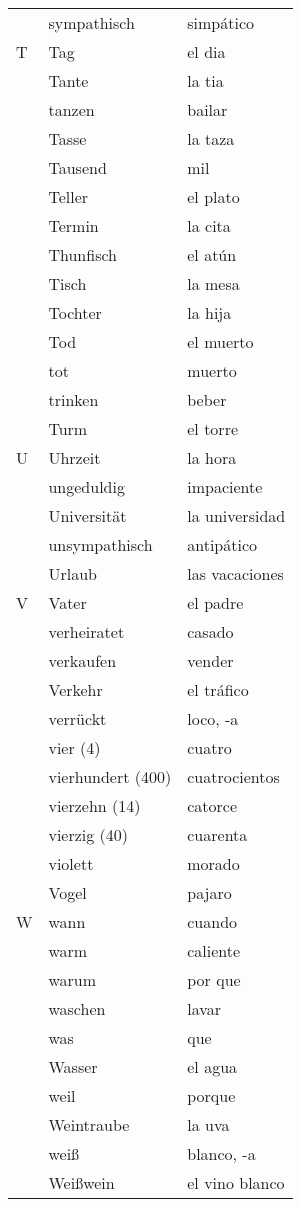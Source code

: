\documentclass[10pt,spanish]{article}
\begin{document}
\begin{longtable}{p{} p{} | p{}}
& sympathisch & simpático \\
T & Tag & el dia  \\
& Tante & la tia  \\
& tanzen & bailar  \\
& Tasse & la taza  \\
& Tausend & mil  \\
& Teller & el plato  \\
& Termin & la cita  \\
& Thunfisch & el atún \\
& Tisch & la mesa  \\
& Tochter & la hija  \\
& Tod & el muerto \\
& tot & muerto \\
& trinken & beber  \\
& Turm & el torre  \\
U & Uhrzeit & la hora  \\
& ungeduldig & impaciente \\
& Universität & la universidad \\
& unsympathisch & antipático\\
& Urlaub & las vacaciones  \\
V & Vater & el padre  \\
& verheiratet & casado  \\
& verkaufen & vender  \\
& Verkehr & el tráfico \\
& verrückt & loco, -a  \\
& vier (4) & cuatro  \\
& vierhundert (400) & cuatrocientos  \\
& vierzehn (14) & catorce  \\
& vierzig (40) & cuarenta  \\
& violett & morado  \\
& Vogel & pajaro  \\
W & wann & cuando  \\
& warm & caliente  \\
& warum & por que  \\
& waschen & lavar  \\
& was & que  \\
& Wasser & el agua \\
& weil & porque  \\
& Weintraube & la uva \\
& weiß & blanco, -a  \\
& Weißwein & el vino blanco  \\

\end{longtable}
\end{document}
